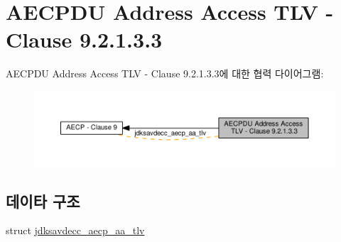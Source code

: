 \hypertarget{group__aecp__aa__tlv}{}\section{A\+E\+C\+P\+DU Address Access T\+LV -\/ Clause 9.2.1.3.3}
\label{group__aecp__aa__tlv}
A\+E\+C\+P\+DU Address Access T\+LV -\/ Clause 9.2.1.3.3에 대한 협력 다이어그램\+:
\nopagebreak
\begin{figure}[H]
\begin{center}
\leavevmode
\includegraphics[width=350pt]{group__aecp__aa__tlv}
\end{center}
\end{figure}
\subsection*{데이타 구조}
\begin{DoxyCompactItemize}
\item 
struct \hyperlink{structjdksavdecc__aecp__aa__tlv}{jdksavdecc\+\_\+aecp\+\_\+aa\+\_\+tlv}
\end{DoxyCompactItemize}
